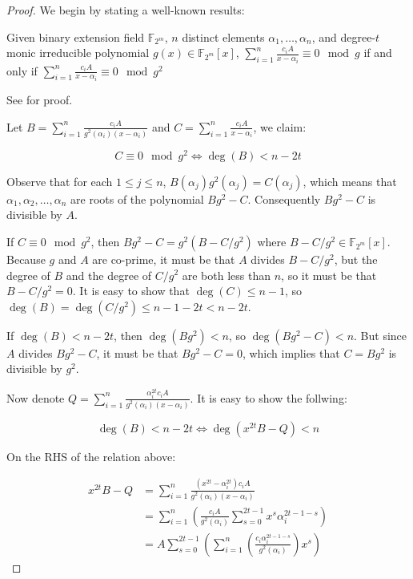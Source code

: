 \documentclass[runningheads]{llncs}
\begin{document}
\begin{proof}
    We begin by stating a well-known results:

    \begin{theorem}\label{thm:goppa-squaring}
        Given binary extension field $\mathbb{F}_{2^m}$, $n$ distinct elements $\alpha_1, \ldots, \alpha_n$, and degree-$t$ monic irreducible polynomial $g(x)\in\mathbb{F}_{2^m}[x]$, $\sum_{i=1}^n\frac{c_iA}{x-\alpha_i}\equiv 0 \mod g$ if and only if $\sum_{i=1}^n\frac{c_iA}{x-\alpha_i}\equiv 0 \mod g^2$
    \end{theorem}
    See \cite{DBLP:journals/iacr/Bernstein22} for proof.

    Let $B = \sum_{i=1}^n\frac{c_iA}{g^2(\alpha_i)(x - \alpha_i)}$ and $C = \sum_{i=1}^n\frac{c_iA}{x - \alpha_i}$, we claim:
    
    \begin{equation}\label{eq:double-sized-lemma-1}
        C \equiv 0 \mod g^2 \Longleftrightarrow \deg(B) < n - 2t
    \end{equation}

    Observe that for each $1\leq j \leq n$, $B(\alpha_j)g^2(\alpha_j) = C(\alpha_j)$, which means that $\alpha_1, \alpha_2, \ldots, \alpha_n$ are roots of the polynomial $Bg^2 - C$. Consequently $Bg^2 - C$ is divisible by $A$.

    If $C \equiv 0 \mod g^2$, then $Bg^2 - C = g^2(B - C/{g^2})$ where $B - C/g^2\in\mathbb{F}_{2^m}[x]$. Because $g$ and $A$ are co-prime, it must be that $A$ divides $B - C/g^2$, but the degree of $B$ and the degree of $C/g^2$ are both less than $n$, so it must be that $B - C/g^2 = 0$. It is easy to show that $\deg(C)\leq n - 1$, so $\deg(B) = \deg(C/g^2) \leq n - 1 - 2t < n - 2t$.

    If $\deg(B) < n - 2t$, then $\deg(Bg^2) < n$, so $\deg(Bg^2 - C) < n$. But since $A$ divides $Bg^2 - C$, it must be that $Bg^2 - C = 0$, which implies that $C = Bg^2$ is divisible by $g^2$.

    Now denote $Q = \sum_{i=1}^{n}\frac{\alpha_i^{2t}c_iA}{g^2(\alpha_i)(x - \alpha_i)}$. It is easy to show the follwing:

    \begin{equation}\label{eq:double-sized-lemma-2}
        \deg(B) < n - 2t \Longleftrightarrow \deg(x^{2t}B - Q) < n
    \end{equation}
    
    On the RHS of the relation above:

    \begin{equation*}\begin{aligned}
        x^{2t}B - Q &= \sum_{i=1}^{n}\frac{(x^{2t} - \alpha_i^{2t})c_iA}{g^2(\alpha_i)(x - \alpha_i)} \\
        &= \sum_{i=1}^{n}\left(
            \frac{c_iA}{g^2(\alpha_i)}\sum_{s=0}^{2t-1}x^s\alpha_i^{2t-1-s}
        \right) \\
        &= A \sum_{s=0}^{2t-1}\left(\sum_{i=1}^{n}\left(\frac{c_i\alpha_i^{2t-1-s}}{g^2(\alpha_i)}\right)x^s\right)
    \end{aligned}\end{equation*}


\end{proof}
\end{document}
